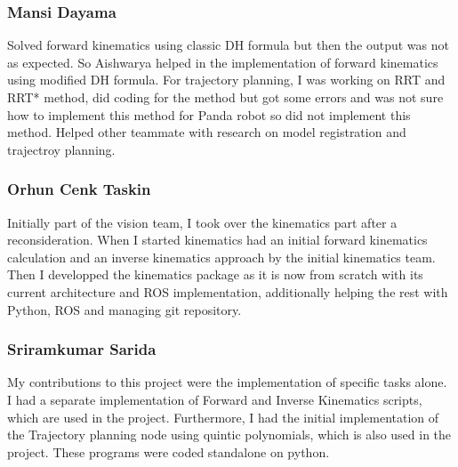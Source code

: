 \subsubsection{Mansi Dayama} Solved forward kinematics using classic DH formula but then the output was not as expected. So Aishwarya helped in the implementation of forward kinematics using modified DH formula. For trajectory planning, I was working on RRT and RRT* method, did coding for the method  but got some errors and was not sure how to implement this method for Panda robot so did not implement this method. Helped other teammate with research on model registration and trajectroy planning.

\subsubsection{Orhun Cenk Taskin}
Initially part of the vision team, I took over the kinematics part after a reconsideration. When I started kinematics had an initial forward kinematics calculation and an inverse kinematics approach by the initial kinematics team. Then I developped the kinematics package as it is now from scratch with its current architecture and ROS implementation, additionally helping the rest with Python, ROS and managing git repository.

\subsubsection{Sriramkumar Sarida}
My contributions to this project were the implementation of specific tasks alone. I had a separate implementation of Forward and Inverse Kinematics scripts, which are used in the project. Furthermore, I had the initial implementation of the Trajectory planning node using quintic polynomials, which is also used in the project. These programs were coded standalone on python.